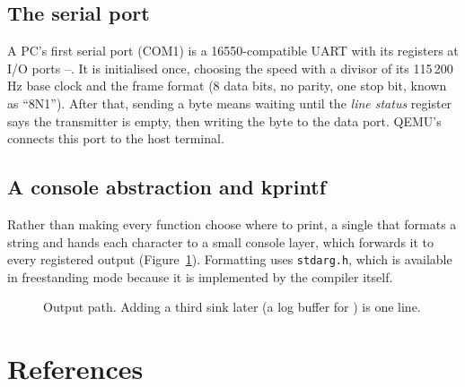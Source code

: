 \documentclass[11pt,a4paper]{article}
\begin{document}
\subsection{The serial port}

A PC's first serial port (COM1) is a 16550-compatible UART with its registers at I/O ports --.
It is initialised once, choosing the speed with a divisor of its 115\,200\,Hz base clock and the frame format
(8 data bits, no parity, one stop bit, known as ``8N1''). After that, sending a byte means waiting until the
\emph{line status} register says the transmitter is empty, then writing the byte to the data port. QEMU's
 connects this port to the host terminal.

\subsection{A console abstraction and kprintf}

Rather than making every function choose where to print, a single  that formats a string and hands
each character to a small console layer, which forwards it to every registered output (Figure~\ref{fig:console}).
Formatting uses \texttt{stdarg.h}, which is available in freestanding mode because it is implemented by the compiler
itself.

\begin{figure}[htbp]
\centering
{}
\caption{Output path. Adding a third sink later (a log buffer for ) is one line.}
\label{fig:console}
\end{figure}

\section{References}
\end{document}
